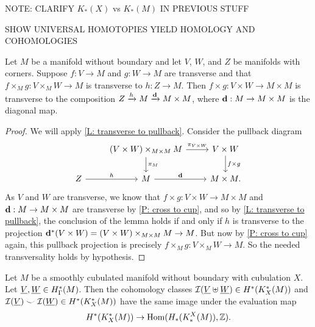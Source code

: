 \documentclass{amsart}
\begin{document}
 NOTE: CLARIFY $K_*(X)$ vs $K_*(M)$ IN PREVIOUS STUFF



SHOW UNIVERSAL HOMOTOPIES YIELD HOMOLOGY AND COHOMOLOGIES




\begin{lemma}\label{L: trans diag cube}
Let $M$ be a manifold without boundary and let $V$, $W$, and $Z$ be  manifolds with corners. Suppose $f:V\to M$ and $g:W\to M$ are transverse and that $f\times_Mg:V\times_MW\to M$ is transverse to $h:Z\to M$. Then $f\times g:V\times W\to M\times M$ is transverse to the composition $Z\xrightarrow{h}M\xrightarrow{\mathbf{d}}M\times M$, where $\mathbf{d}:M\to M\times M$ is the diagonal map. 
\end{lemma}
\begin{proof}
We will apply \cref{L: transverse to pullback}. Consider the pullback diagram
	\[
	\begin{tikzcd}
		& (V \times W)\times_{M\times M} M \arrow[r, "\pi_{V\times W}"] \arrow[d, "\pi_M"] & V\times W \arrow[d, "f\times g"] \\
		Z \arrow[r, "h"] & M \arrow[r, "\diag"]&  M\times M.
	\end{tikzcd}
	\]
As $V$ and $W$ are transverse, we know that $f\times g:V\times W\to M\times M$ and $\mathbf{d}:M\to M\times M$ are transverse by \cref{P: cross to cup}, and so by \cref{L: transverse to pullback}, the conclusion of the lemma holds if and only if $h$ is transverse to the projection $\mathbf{d}^*(V\times W)=(V \times W)\times_{M\times M} M \to M$. But now by \cref{P: cross to cup} again, this pullback projection is precisely $f\times_Mg:V\times_MW\to M$. So the needed transversality holds by hypothesis. 
\end{proof}



\begin{proposition}
Let $M$ be a smoothly cubulated manifold without boundary with cubulation $X$. Let $\underline{V},\underline{W}\in H^*_\Gamma(M)$. Then the cohomology classes $\mathcal{I}(\underline{V}\uplus\underline{W})\in H^*(K_X^*(M))$ and $\mathcal{I}(\underline{V}) \smile \mathcal{I}(\underline{W})\in H^*(K_X^*(M))$ have the same image under the evaluation map $$H^*(K_X^*(M))\to \textup{Hom}(H_*(K_*^X(M)),\mathbb{Z}).$$ 
\end{proposition}
\end{document}
